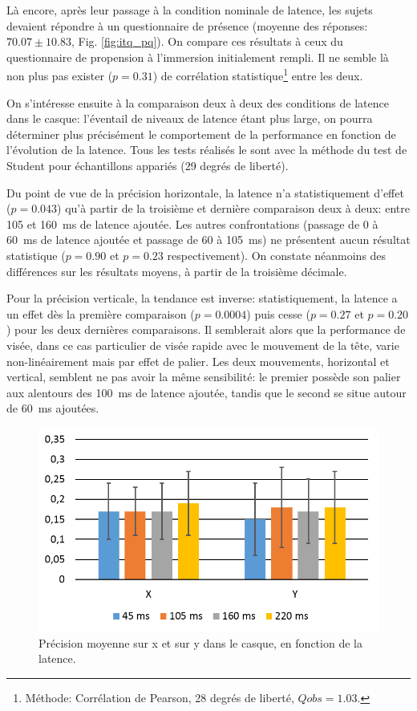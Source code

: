 	\par Là encore, après leur passage à la condition nominale de latence, les sujets devaient répondre à un questionnaire de présence (moyenne des réponses: $70.07 \pm 10.83$, Fig. \ref{fig:itq_pq}). On compare ces résultats à ceux du questionnaire de propension à l'immersion initialement rempli. Il ne semble là non plus pas exister ($p = 0.31$) de corrélation statistique\footnote{Méthode: Corrélation de Pearson, 28 degrés de liberté, $Qobs = 1.03$.} entre les deux.
	
	\par On s'intéresse ensuite à la comparaison deux à deux des conditions de latence dans le casque: l'éventail de niveaux de latence étant plus large, on pourra déterminer plus précisément le comportement de la performance en fonction de l'évolution de la latence. Tous les tests réalisés le sont avec la méthode du test de Student pour échantillons appariés (29 degrés de liberté).
	
	\par Du point de vue de la précision horizontale, la latence n'a statistiquement d'effet ($p = 0.043$) qu'à partir de la troisième et dernière comparaison deux à deux: entre 105 et 160~ms de latence ajoutée. Les autres confrontations (passage de 0 à 60~ms de latence ajoutée et passage de 60 à 105~ms) ne présentent aucun résultat statistique ($p = 0.90$ et $p = 0.23$ respectivement). On constate néanmoins des différences sur les résultats moyens, à partir de la troisième décimale.
	
	\par Pour la précision verticale, la tendance est inverse: statistiquement, la latence a un effet dès la première comparaison ($p = 0.0004$) puis cesse ($p = 0.27$ et $p = 0.20$) pour les deux dernières comparaisons. Il semblerait alors que la performance de visée, dans ce cas particulier de visée rapide avec le mouvement de la tête, varie non-linéairement mais par effet de palier. Les deux mouvements, horizontal et vertical, semblent ne pas avoir la même sensibilité: le premier possède son palier aux alentours des 100~ms de latence ajoutée, tandis que le second se situe autour de 60~ms ajoutées.
	
	\begin{figure}[h]
		\centering
		\includegraphics[width=0.8\linewidth]{Figures/CasquePrecisionResults.png}
		\caption{Précision moyenne sur x et sur y dans le casque, en fonction de la latence.}
		\label{fig:casque_precision}
	\end{figure}
	

